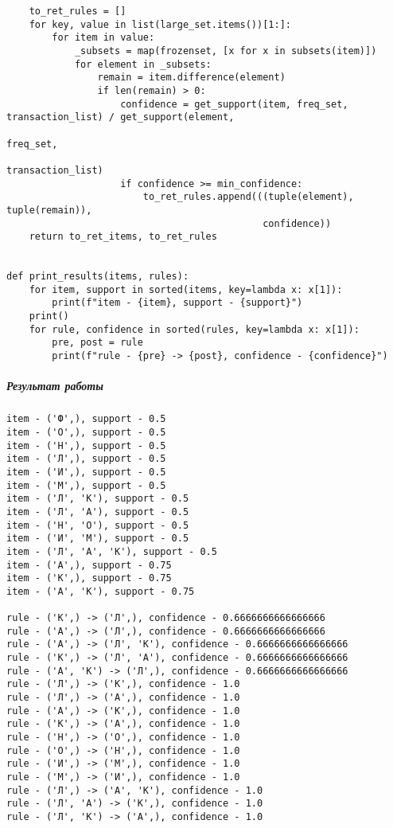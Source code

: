 \documentclass[
]{article}
\begin{document}
\begin{verbatim}
    to_ret_rules = []
    for key, value in list(large_set.items())[1:]:
        for item in value:
            _subsets = map(frozenset, [x for x in subsets(item)])
            for element in _subsets:
                remain = item.difference(element)
                if len(remain) > 0:
                    confidence = get_support(item, freq_set, transaction_list) / get_support(element,
                                                                                             freq_set,
                                                                                             transaction_list)
                    if confidence >= min_confidence:
                        to_ret_rules.append(((tuple(element), tuple(remain)),
                                             confidence))
    return to_ret_items, to_ret_rules


def print_results(items, rules):
    for item, support in sorted(items, key=lambda x: x[1]):
        print(f"item - {item}, support - {support}")
    print()
    for rule, confidence in sorted(rules, key=lambda x: x[1]):
        pre, post = rule
        print(f"rule - {pre} -> {post}, confidence - {confidence}")
\end{verbatim}

\hypertarget{ux440ux435ux437ux443ux43bux44cux442ux430ux442-ux440ux430ux431ux43eux442ux44b}{%
\subparagraph{Результат
работы}\label{ux440ux435ux437ux443ux43bux44cux442ux430ux442-ux440ux430ux431ux43eux442ux44b}}

\begin{verbatim}
item - ('Ф',), support - 0.5
item - ('О',), support - 0.5
item - ('Н',), support - 0.5
item - ('Л',), support - 0.5
item - ('И',), support - 0.5
item - ('М',), support - 0.5
item - ('Л', 'К'), support - 0.5
item - ('Л', 'А'), support - 0.5
item - ('Н', 'О'), support - 0.5
item - ('И', 'М'), support - 0.5
item - ('Л', 'А', 'К'), support - 0.5
item - ('А',), support - 0.75
item - ('К',), support - 0.75
item - ('А', 'К'), support - 0.75

rule - ('К',) -> ('Л',), confidence - 0.6666666666666666
rule - ('А',) -> ('Л',), confidence - 0.6666666666666666
rule - ('А',) -> ('Л', 'К'), confidence - 0.6666666666666666
rule - ('К',) -> ('Л', 'А'), confidence - 0.6666666666666666
rule - ('А', 'К') -> ('Л',), confidence - 0.6666666666666666
rule - ('Л',) -> ('К',), confidence - 1.0
rule - ('Л',) -> ('А',), confidence - 1.0
rule - ('А',) -> ('К',), confidence - 1.0
rule - ('К',) -> ('А',), confidence - 1.0
rule - ('Н',) -> ('О',), confidence - 1.0
rule - ('О',) -> ('Н',), confidence - 1.0
rule - ('И',) -> ('М',), confidence - 1.0
rule - ('М',) -> ('И',), confidence - 1.0
rule - ('Л',) -> ('А', 'К'), confidence - 1.0
rule - ('Л', 'А') -> ('К',), confidence - 1.0
rule - ('Л', 'К') -> ('А',), confidence - 1.0
\end{verbatim}
\end{document}
